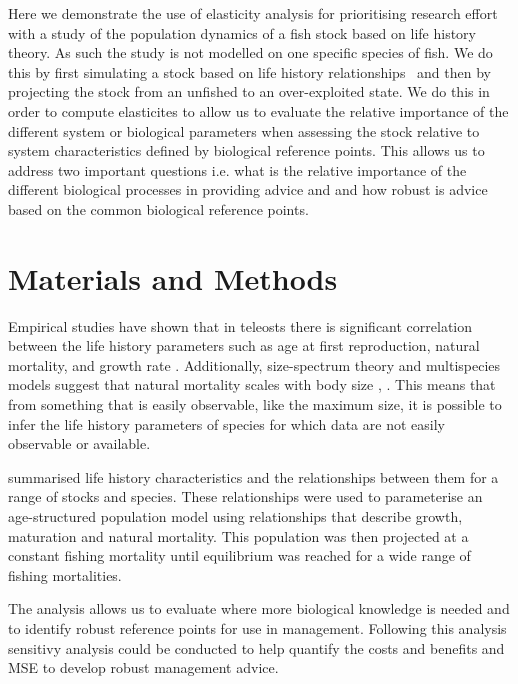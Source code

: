 \documentclass[10pt]{article}
\begin{document}
Here we demonstrate the use of elasticity analysis for prioritising research effort with a study of the population dynamics of a fish stock based on life history theory.
As such the study is not modelled on one specific species of fish. We do this by first simulating a stock based on life history relationships~\cite{gislason2008coexistence} 
and then by projecting the stock from an unfished to an over-exploited state. We do this in order to compute elasticites to allow us to evaluate the relative importance of 
the different system or biological parameters when assessing the stock relative to system characteristics defined by biological reference points. This allows us to address 
two important questions i.e. what is the relative importance of the different biological processes in providing advice and and how robust is advice based on the common 
biological reference points.


\section*{Materials and Methods}

Empirical studies have shown that in teleosts there is significant correlation between the life history parameters  
such as age at first reproduction, natural mortality, and growth rate \cite{roff1984evolution}. Additionally, size-spectrum theory 
and multispecies models suggest that natural mortality scales with body size \cite{andersen2006asymptotic}, 
\cite{pope2006modelling} \cite{gislason2008coexistence}. This means that from something that is easily observable, like the maximum size,
it is possible to infer the life history parameters of species for which data are not easily observable or available.

\cite{gislason2008coexistence} summarised life history characteristics and the relationships between them for a range of stocks and species. 
These relationships were used to parameterise an age-structured population model using relationships that describe growth, maturation and natural mortality.
This population was then projected at a constant fishing mortality until equilibrium was reached for a wide range of fishing mortalities.

The analysis allows us to evaluate where more biological knowledge is needed and to identify robust reference points for use in management. Following this analysis
sensitivy analysis could be conducted to help quantify the costs and benefits and MSE to develop robust management advice.
\end{document}
